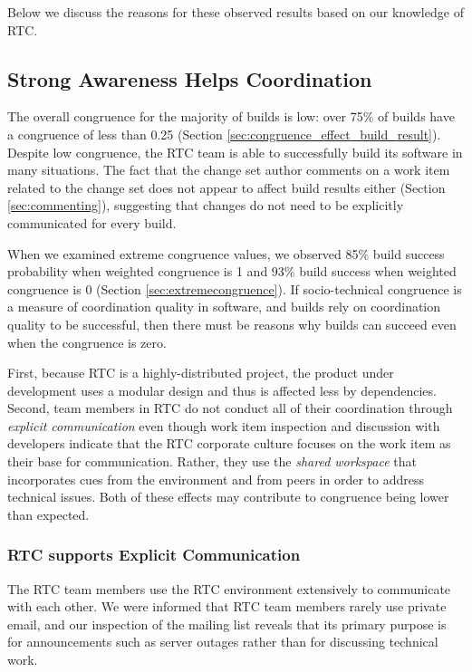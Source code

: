 Below we discuss the reasons for these observed results based on our knowledge of RTC.

\subsection{Strong Awareness Helps Coordination}
The overall congruence for the majority of builds is low: over 75\% of
builds have a congruence of less than 0.25 (Section \ref{sec:congruence_effect_build_result}).
Despite low congruence, the RTC team is able to successfully build its software in many situations.
The fact that the change set author comments on a work item related to the change set does not appear to affect build results either (Section \ref{sec:commenting}), suggesting that changes do not need to be explicitly communicated for every build.


When we examined extreme congruence values, we observed 85\% build success probability when weighted congruence is 1 and 93\% build success when weighted congruence is 0 (Section \ref{sec:extremecongruence}).
If socio-technical congruence is a measure of coordination quality in software, and builds rely on coordination quality to be successful, then there must be reasons why builds can succeed even when the congruence is zero.

First, because RTC is a highly-distributed project, the product under development uses a modular design \cite{maccormack2006} and thus is affected less by dependencies. Second, team members in RTC do not conduct all of their coordination through \emph{explicit communication} even though work item inspection and discussion with developers indicate that the RTC corporate culture focuses on the work item as their base for communication. Rather, they use the \emph{shared workspace} that incorporates cues from the environment and from peers in order to address technical issues. Both of these effects may contribute to congruence being lower than expected.

\subsubsection{RTC supports Explicit Communication}
The RTC team members use the RTC environment extensively to communicate with each other. We were informed that RTC team members rarely use private email, and our inspection of the mailing list reveals that its primary purpose is for announcements such as server outages rather than for discussing technical work.

